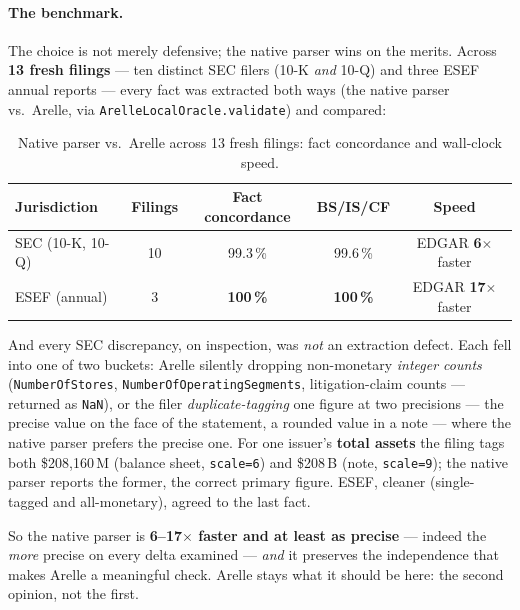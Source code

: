 \documentclass[11pt,a4paper]{report}
\begin{document}
\paragraph{The benchmark.} The choice is not merely defensive; the native parser wins on the merits. Across
\textbf{13 fresh filings} --- ten distinct SEC filers (10-K \emph{and} 10-Q) and three ESEF annual reports ---
every fact was extracted both ways (the native parser vs.\ Arelle, via \texttt{ArelleLocalOracle.validate})
and compared:

\begin{table}[h]
\centering\small
\caption{Native parser vs.\ Arelle across 13 fresh filings: fact concordance and wall-clock speed.}
\label{tab:parser-vs-arelle}
\begin{tabular}{@{}lcccc@{}}
\toprule
\textbf{Jurisdiction} & \textbf{Filings} & \textbf{Fact concordance} & \textbf{BS/IS/CF} & \textbf{Speed} \\
\midrule
SEC (10-K, 10-Q) & 10 & 99.3\,\% & 99.6\,\% & EDGAR \textbf{6\(\times\)} faster \\
ESEF (annual)    & 3  & \textbf{100\,\%} & \textbf{100\,\%} & EDGAR \textbf{17\(\times\)} faster \\
\bottomrule
\end{tabular}
\end{table}

\noindent And every SEC discrepancy, on inspection, was \emph{not} an extraction defect. Each fell into one
of two buckets: Arelle silently dropping non-monetary \emph{integer counts} (\texttt{NumberOfStores},
\texttt{NumberOfOperatingSegments}, litigation-claim counts --- returned as \texttt{NaN}), or the filer
\emph{duplicate-tagging} one figure at two precisions --- the precise value on the face of the statement, a
rounded value in a note --- where the native parser prefers the precise one. For one issuer's \textbf{total
assets} the filing tags both \$208{,}160\,M (balance sheet, \texttt{scale=6}) and \$208\,B (note,
\texttt{scale=9}); the native parser reports the former, the correct primary figure. ESEF, cleaner
(single-tagged and all-monetary), agreed to the last fact.

So the native parser is \textbf{6--17\(\times\) faster and at least as precise} --- indeed the \emph{more}
precise on every delta examined --- \emph{and} it preserves the independence that makes Arelle a meaningful
check. Arelle stays what it should be here: the second opinion, not the first.
\end{document}

